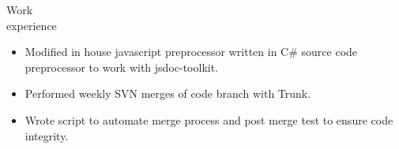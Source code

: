 \begin{category}{Work \\experience}
\begin{itemize}
\item Modified in house javascript preprocessor written in C\# source code preprocessor to work with jsdoc-toolkit. %

\item Performed weekly SVN merges of code branch with Trunk. %
\item Wrote script to automate merge process and post merge test to ensure code integrity.




\end{itemize}
\end{category}
